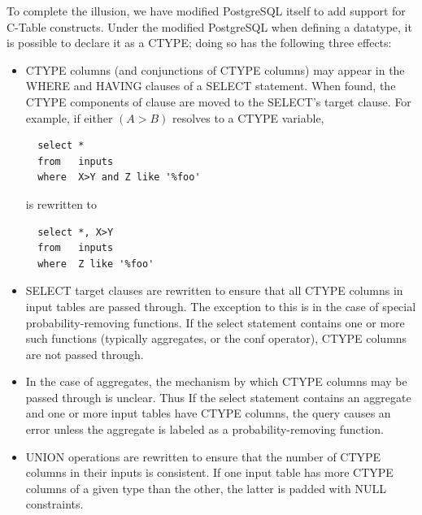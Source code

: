 %
%


To complete the illusion, we have modified PostgreSQL itself to add support for C-Table constructs.  Under the modified PostgreSQL when defining a datatype, it is possible to declare it as a CTYPE; doing so has the following three effects:
\begin{itemize}
\item CTYPE columns (and conjunctions of CTYPE columns) may appear in the WHERE and HAVING clauses of a SELECT statement.  When found, the CTYPE components of clause are moved to the SELECT's target clause.  For example, if either $(A>B)$ resolves to a CTYPE variable, 
{\small\begin{verbatim}
  select *
  from   inputs
  where  X>Y and Z like '%foo'
\end{verbatim}}
is rewritten to
{\small\begin{verbatim}
  select *, X>Y
  from   inputs
  where  Z like '%foo'
\end{verbatim}}

\item SELECT target clauses are rewritten to ensure that all CTYPE columns in input tables are passed through.   The exception to this is in the case of special probability-removing functions.  If the select statement contains one or more such functions (typically aggregates, or the conf operator), CTYPE columns are not passed through.  

\item In the case of aggregates, the mechanism by which CTYPE columns may be passed through is unclear.  Thus If the select statement contains an aggregate and one or more input tables have CTYPE columns, the query causes an error unless the aggregate is labeled as a probability-removing function.

\item UNION operations are rewritten to ensure that the number of CTYPE columns in their inputs is consistent.  If one input table has more CTYPE columns of a given type than the other, the latter is padded with NULL constraints.

\end{itemize}

